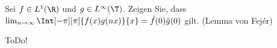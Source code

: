 
\begin{exercise}

Sei $f \in L^1(\R)$ und $g \in L^\infty(\T)$.
Zeigen Sie, dass $\lim_{n \to \infty} \Int[-\pi][\pi]{f(x) g(n x)}{x} = \hat f(0) \hat g(0)$ gilt.
(Lemma von Fejér)

\end{exercise}


\begin{solution}

ToDo!

\end{solution}

